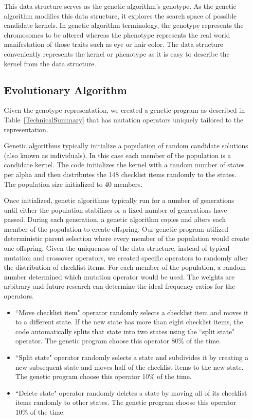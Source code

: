 \documentclass[3p,times,procedia]{elsarticle}
\begin{document}
This data structure serves as the genetic algorithm's genotype. As the genetic algorithm modifies this data structure, it explores the search space of possible candidate kernels. In genetic algorithm terminology, the genotype represents the chromosomes to be altered whereas the phenotype represents the real world manifestation of those traits such as eye or hair color. The data structure conveniently represents the kernel or phenotype as it is easy to describe the kernel from the data structure.\cite{Eiben2003} 

\subsection{Evolutionary Algorithm}
\label{Evolutionary Algorithm}

Given the genotype representation, we created a genetic program \cite{GithubGeneticAlgorithm} as described in Table~\ref{TechnicalSummary} that has mutation operators uniquely tailored to the representation.

Genetic algorithms typically initialize a population of random candidate solutions (also known as individuals). In this case each member of the population is a candidate kernel. The code initializes the kernel with a random number of states per alpha and then distributes the 148 checklist items randomly to the states. The population size initialized to 40 members.

Once initialized, genetic algorithms typically run for a number of generations until either the population stabilizes or a fixed number of generations have passed. During each generation, a genetic algorithm copies and alters each member of the population to create offspring. Our genetic program utilized deterministic parent selection where every member of the population would create one offspring. Given the uniqueness of the data structure, instead of typical mutation and crossover operators, we created specific operators to randomly alter the distribution of checklist items. For each member of the population, a random number determined which mutation operator would be used. The weights are arbitrary and future research can determine the ideal frequency ratios for the operators. 

\begin{itemize}
\item ``Move checklist item" operator randomly selects a checklist item and moves it to a different state. If the new state has more than eight checklist items, the code automatically splits that state into two states using the ``split state" operator. The genetic program choose this operator 80\% of the time.
\item ``Split state" operator randomly selects a state and subdivides it by creating a new subsequent state and moves half of the checklist items to the new state. The genetic program choose this operator 10\% of the time.
\item ``Delete state" operator randomly deletes a state by moving all of its checklist items randomly to other states. The genetic program choose this operator 10\% of the time.
\end{itemize}
\end{document}
